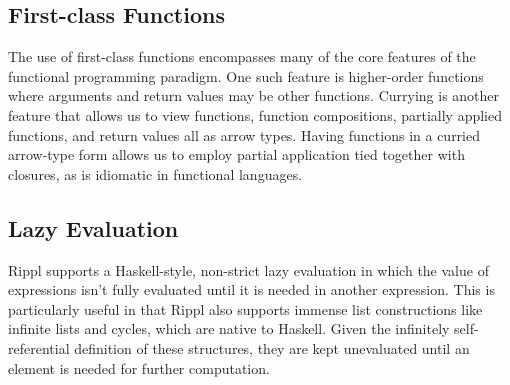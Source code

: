 ﻿\documentclass[5pt]{article}
\begin{document}
\subsection{First-class Functions}
The use of first-class functions encompasses many of the core features of the functional programming paradigm. One such feature is higher-order functions where arguments and return values may be other functions. Currying is another feature that allows us to view functions, function compositions, partially applied functions, and return values all as arrow types. Having functions in a curried arrow-type form allows us to employ partial application tied together with closures, as is idiomatic in functional languages.
\subsection{Lazy Evaluation}
Rippl supports a Haskell-style, non-strict lazy evaluation in which the value of expressions isn’t fully evaluated until it is needed in another expression. This is particularly useful in that Rippl also supports immense list constructions like infinite lists and cycles, which are native to Haskell. Given the infinitely self-referential definition of these structures, they are kept unevaluated until an element is needed for further computation.
\pagebreak
\end{document}
